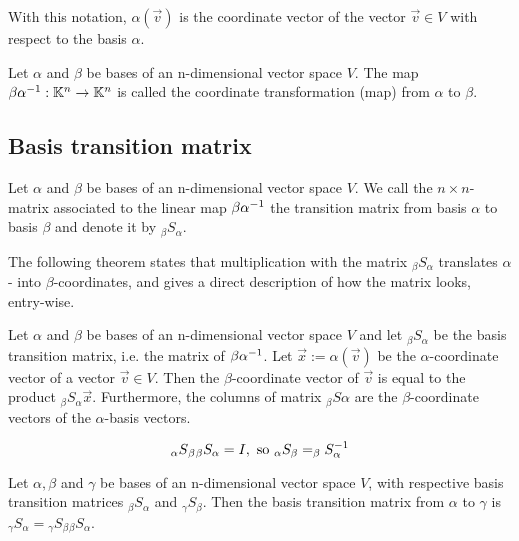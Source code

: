 With this notation, $\alpha(\vec{v})$ is the coordinate vector of the vector $\vec{v} \in V$ with respect to the basis $\alpha$. 

\begin{definition}
    Let $\alpha$ and $\beta$ be bases of an n-dimensional vector space $V$. The map $\beta\alpha^{-1}: \mathbb{K}^n \to \mathbb{K}^n$
    is called the coordinate transformation (map) from $\alpha$ to $\beta$.
\end{definition}

\subsection{Basis transition matrix}

\begin{definition}
    Let $\alpha$ and $\beta$ be bases of an n-dimensional vector space $V$. We call the $n \times n$-matrix associated
    to the linear map $\beta\alpha^{-1}$ the transition matrix from basis $\alpha$ to basis $\beta$ and denote it by $_\beta S _\alpha$.
\end{definition}

The following theorem states that multiplication with the matrix $_\beta S _\alpha$ translates $\alpha$- into $\beta$-coordinates,
and gives a direct description of how the matrix looks, entry-wise.

\begin{theorem}
    Let $\alpha$ and $\beta$ be bases of an n-dimensional vector space $V$ and let $_\beta S _\alpha$ be the basis transition matrix,
    i.e. the matrix of $\beta\alpha^{-1}$. Let $\vec{x}:=\alpha(\vec{v})$ be the $\alpha$-coordinate vector of a vector $\vec{v} \in V$.
    Then the $\beta$-coordinate vector of $\vec{v}$ is equal to the product $_\beta S _\alpha \vec{x}$. Furthermore, the columns
    of matrix $_\beta S \alpha$ are the $\beta$-coordinate vectors of the $\alpha$-basis vectors.
\end{theorem}

\begin{remark}
    $$_\alpha S {_\beta} {_\beta} S _\alpha = I, \text{ so } _\alpha S _\beta = _\beta S _\alpha ^{-1}$$
\end{remark}

\begin{theorem}
    Let $\alpha, \beta$ and $\gamma$ be bases of an n-dimensional vector space $V$, with respective basis transition
    matrices $_\beta S _\alpha$ and $_\gamma S _\beta$. Then the basis transition matrix from $\alpha$ to $\gamma$ is
    $_\gamma S _\alpha = {_\gamma} S _\beta {_\beta} S _\alpha$.
\end{theorem}

